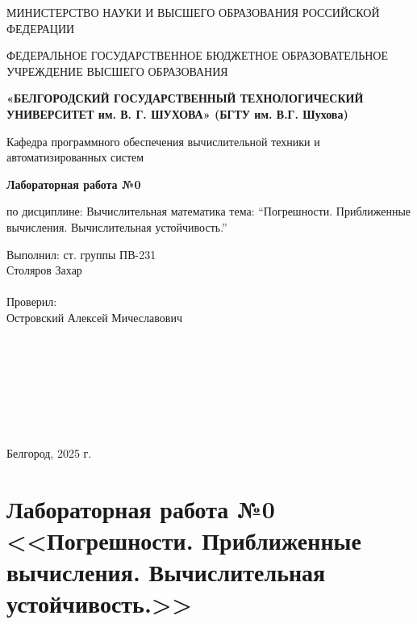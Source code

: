 \documentclass{report}
\newcommand{\q}[1]{``#1''}
\begin{document}
	\begin{titlepage}
		\begin{center}
			МИНИСТЕРСТВО НАУКИ И ВЫСШЕГО ОБРАЗОВАНИЯ\linebreak 
			РОССИЙСКОЙ ФЕДЕРАЦИИ\medskip
			
			ФЕДЕРАЛЬНОЕ ГОСУДАРСТВЕННОЕ БЮДЖЕТНОЕ ОБРАЗОВАТЕЛЬНОЕ 
			УЧРЕЖДЕНИЕ ВЫСШЕГО ОБРАЗОВАНИЯ\medskip
			
			\textbf{
				«БЕЛГОРОДСКИЙ ГОСУДАРСТВЕННЫЙ \linebreak
				ТЕХНОЛОГИЧЕСКИЙ УНИВЕРСИТЕТ им. В. Г. ШУХОВА»\linebreak
				(БГТУ им. В.Г. Шухова)
			}\bigskip
			
			Кафедра программного обеспечения вычислительной техники и автоматизированных систем
			\vspace{5cm}
			
			\Large\textbf{Лабораторная работа №0}
			
			\large по дисциплине: Вычислительная математика\linebreak
			тема: \q{Погрешности. Приближенные вычисления. Вычислительная устойчивость.}
		\end{center}\vspace{6cm}
		
		\begin{flushright}
			\begin{minipage}{7cm}
				Выполнил: ст. группы ПВ-231\\
				Столяров Захар\\
				\\
				Проверил: \\
				Островский Алексей Мичеславович\\
			\end{minipage}
		\end{flushright}\bigskip
		
		\
		
		\
		
		\
		
		\
		
		
		\begin{center}
			Белгород, 2025 г.
		\end{center}
	\end{titlepage}
	
	\newpage
	
	\setcounter{secnumdepth}{-1}
	\chapter{Лабораторная работа №0 <<Погрешности. Приближенные вычисления. Вычислительная устойчивость.>>}
	
\end{document}
